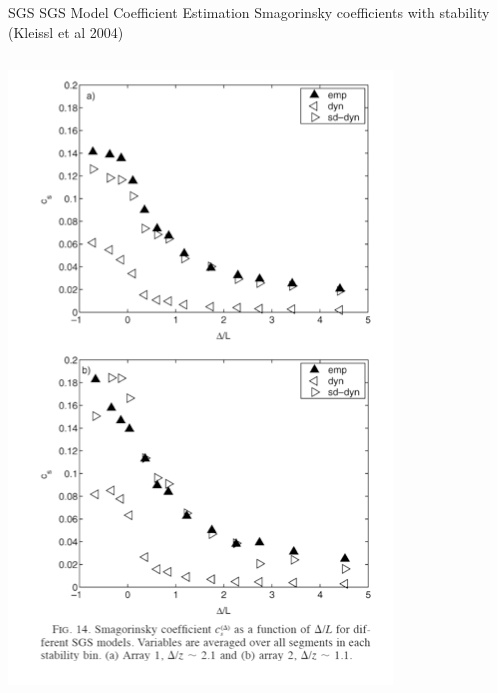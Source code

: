 \begin{frame}{SGS SGS Model Coefficient Estimation}
Smagorinsky coefficients with stability (Kleissl et al 2004) 
	\begin{columns}
    \begin{column}{.45\textwidth}
    \begin{minipage}[c][.9\textheight][c]{\linewidth}
    \includegraphics[width=\textwidth]{apriori16}
      \end{minipage}
    \end{column}
    \begin{column}{.6\textwidth}
    \vspace{-10pt}
      \begin{figure}

\end{figure}
\end{column}
\end{columns}
\end{frame}

